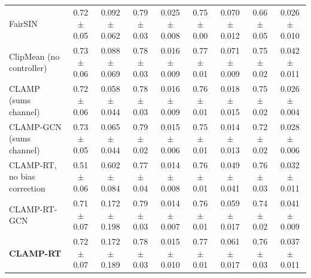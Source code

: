 \begin{table}[tbp]
{\begin{tabular}{lcccccccc}
FairSIN & 0.72$\pm$0.05 & 0.092$\pm$0.062 & 0.79$\pm$0.03 & 0.025$\pm$0.008 & 0.75$\pm$0.00 & 0.070$\pm$0.012 & 0.66$\pm$0.05 & 0.026$\pm$0.010 \\
ClipMean (no controller) & 0.73$\pm$0.06 & 0.088$\pm$0.069 & 0.78$\pm$0.03 & 0.016$\pm$0.009 & 0.77$\pm$0.01 & 0.071$\pm$0.009 & 0.75$\pm$0.02 & 0.042$\pm$0.011 \\
\midrule
CLAMP (sums channel) & 0.72$\pm$0.06 & 0.058$\pm$0.044 & 0.78$\pm$0.03 & 0.016$\pm$0.009 & 0.76$\pm$0.01 & 0.018$\pm$0.015 & 0.75$\pm$0.02 & 0.026$\pm$0.004 \\
CLAMP-GCN (sums channel) & 0.73$\pm$0.05 & 0.065$\pm$0.044 & 0.79$\pm$0.02 & 0.015$\pm$0.006 & 0.75$\pm$0.01 & 0.014$\pm$0.013 & 0.72$\pm$0.02 & 0.028$\pm$0.006 \\
\midrule
CLAMP-RT, no bias correction & 0.51$\pm$0.06 & 0.602$\pm$0.084 & 0.77$\pm$0.04 & 0.014$\pm$0.008 & 0.76$\pm$0.01 & 0.049$\pm$0.041 & 0.76$\pm$0.03 & 0.032$\pm$0.011 \\
CLAMP-RT-GCN & 0.71$\pm$0.07 & 0.172$\pm$0.198 & 0.79$\pm$0.03 & 0.014$\pm$0.007 & 0.76$\pm$0.01 & 0.059$\pm$0.017 & 0.74$\pm$0.02 & 0.041$\pm$0.009 \\
\textbf{CLAMP-RT} & 0.72$\pm$0.07 & 0.172$\pm$0.189 & 0.78$\pm$0.03 & 0.015$\pm$0.010 & 0.77$\pm$0.01 & 0.061$\pm$0.017 & 0.76$\pm$0.03 & 0.037$\pm$0.011 \\
\bottomrule
\end{tabular}}
\vspace{4pt}
\end{table}
